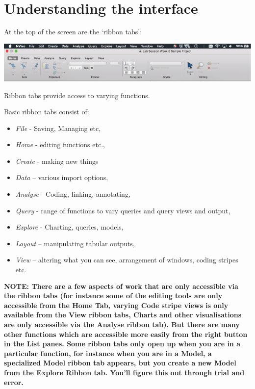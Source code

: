 \documentclass[]{book}
\providecommand{\tightlist}{%
  \setlength{\itemsep}{0pt}\setlength{\parskip}{0pt}}
\theoremstyle{definition}
\theoremstyle{definition}
\theoremstyle{definition}
\theoremstyle{remark}
\begin{document}
\hypertarget{understanding-the-interface}{%
\section{Understanding the
interface}\label{understanding-the-interface}}

At the top of the screen are the `ribbon tabs':

\includegraphics{imgs/qual_08.png}

Ribbon tabs provide access to varying functions.

Basic ribbon tabs consist of:

\begin{itemize}
\tightlist
\item
  \emph{File} - Saving, Managing etc,
\item
  \emph{Home} - editing functions etc.,
\item
  \emph{Create} - making new things
\item
  \emph{Data} -- various import options,
\item
  \emph{Analyse} - Coding, linking, annotating,
\item
  \emph{Query} - range of functions to vary queries and query views and
  output,
\item
  \emph{Explore} - Charting, queries, models,
\item
  \emph{Layout} -- manipulating tabular outputs,
\item
  \emph{View} -- altering what you can see, arrangement of windows,
  coding stripes etc.
\end{itemize}

\textbf{NOTE: There are a few aspects of work that are only accessible
via the ribbon tabs (for instance some of the editing tools are only
accessible from the Home Tab, varying Code stripe views is only
available from the View ribbon tabs, Charts and other visualisations are
only accessible via the Analyse ribbon tab). But there are many other
functions which are accessible more easily from the right button in the
List panes. Some ribbon tabs only open up when you are in a particular
function, for instance when you are in a Model, a specialized Model
ribbon tab appears, but you create a new Model from the Explore Ribbon
tab. You'll figure this out through trial and error.}
\end{document}

